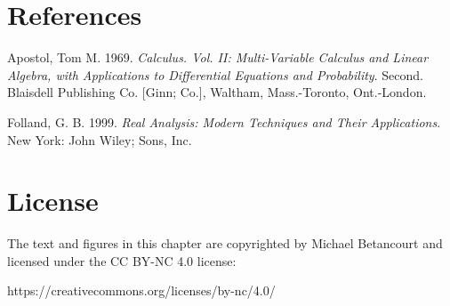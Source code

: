 \documentclass[
  letterpaper,
  DIV=11,
  numbers=noendperiod]{scrartcl}
\newlength{\cslhangindent}
\newenvironment{CSLReferences}[2] %
 {\begin{list}{}{%
  \setlength{\itemindent}{0pt}
  \setlength{\leftmargin}{0pt}
  \setlength{\parsep}{0pt}
  \ifodd #1
   \setlength{\leftmargin}{\cslhangindent}
   \setlength{\itemindent}{-1\cslhangindent}
  \fi
  \setlength{\itemsep}{#2\baselineskip}}}
 {\end{list}}
\begin{document}
\section*{References}\label{references}

\label{refs}
\begin{CSLReferences}{1}{0}
Apostol, Tom M. 1969. \emph{Calculus. {V}ol. {II}: {M}ulti-Variable
Calculus and Linear Algebra, with Applications to Differential Equations
and Probability}. Second. Blaisdell Publishing Co. {[}Ginn; Co.{]},
Waltham, Mass.-Toronto, Ont.-London.

Folland, G. B. 1999. \emph{Real Analysis: Modern Techniques and Their
Applications}. New York: John Wiley; Sons, Inc.

\end{CSLReferences}

\section*{License}\label{license}

The text and figures in this chapter are copyrighted by Michael
Betancourt and licensed under the CC BY-NC 4.0 license:

https://creativecommons.org/licenses/by-nc/4.0/
\end{document}
